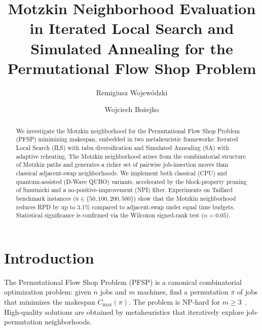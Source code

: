 \documentclass[runningheads]{llncs}
\begin{document}
\title{Motzkin Neighborhood Evaluation in Iterated Local Search and Simulated Annealing for the Permutational Flow Shop Problem}

\author{Remigiusz Wojewódzki \and
Wojciech Bożejko}



\maketitle

\begin{abstract}
We investigate the Motzkin neighborhood for the Permutational Flow Shop Problem (PFSP) minimizing makespan, embedded in two metaheuristic frameworks: Iterated Local Search (ILS) with tabu diversification and Simulated Annealing (SA) with adaptive reheating. The Motzkin neighborhood arises from the combinatorial structure of Motzkin paths and generates a richer set of pairwise job-insertion moves than classical adjacent-swap neighborhoods. We implement both classical (CPU) and quantum-assisted (D-Wave QUBO) variants, accelerated by the block-property pruning of Smutnicki and a no-positive-improvement (NPI) filter. Experiments on Taillard benchmark instances ($n \in \{50, 100, 200, 500\}$) show that the Motzkin neighborhood reduces RPD by up to 3.1\% compared to adjacent-swap under equal time budgets. Statistical significance is confirmed via the Wilcoxon signed-rank test ($\alpha = 0.05$).
\end{abstract}


\section{Introduction}

The Permutational Flow Shop Problem (PFSP) is a canonical combinatorial optimization problem: given $n$ jobs and $m$ machines, find a permutation $\pi$ of jobs that minimizes the makespan $C_{\max}(\pi)$. The problem is NP-hard for $m \geq 3$~\cite{garey79}. High-quality solutions are obtained by metaheuristics that iteratively explore job-permutation neighborhoods.
\end{document}
